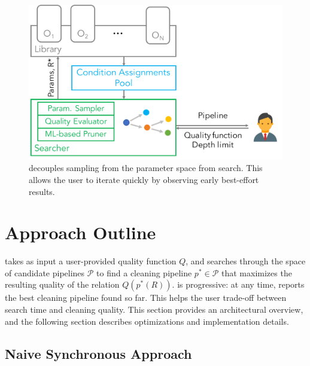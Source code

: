 \begin{figure}[t]
\centering
 \includegraphics[width=0.7\columnwidth]{figures/arch}
 \caption{\small \sys decouples sampling from the parameter space from search. This allows the user to iterate quickly by observing early best-effort results. \label{fig:arch}}
\end{figure}



\section{Approach Outline}

\sys takes as input a user-provided quality function $Q$, and searches through the space of candidate pipelines $\mathcal{P}$ to find a cleaning pipeline $p^*\in\mathcal{P}$ that maximizes the resulting quality of the relation $Q(p^*(R))$.  \sys is progressive: at any time, \sys reports the best cleaning pipeline found so far.  This helps the user trade-off between search time and cleaning quality.  This section provides an architectural overview, and the following section describes optimizations and implementation details.





\subsection{Naive Synchronous Approach}


